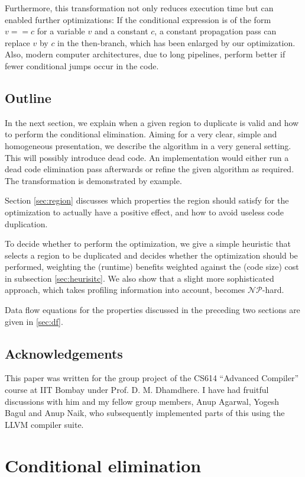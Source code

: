\documentclass[halfparskip]{scrartcl}
\begin{document}
Furthermore, this transformation not only reduces execution time but can enabled further optimizations: If the conditional expression is of the form $v==c$ for a variable $v$ and a constant $c$, a constant propagation pass can replace $v$ by $c$ in the then-branch, which has been enlarged by our optimization. Also, modern computer architectures, due to long pipelines, perform better if fewer conditional jumps occur in the code.

\subsection{Outline}

In the next section, we explain when a given region to duplicate is valid and how to perform the conditional elimination. Aiming for a very clear, simple and homogeneous presentation, we describe the algorithm in a very general setting. This will possibly introduce dead code. An implementation would either run a dead code elimination pass afterwards or refine the given algorithm as required. The transformation is demonstrated by example.

Section \ref{sec:region} discusses which properties the region should satisfy for the optimization to actually have a positive effect, and how to avoid useless code duplication.

To decide whether to perform the optimization, we give a simple heuristic that selects a region to be duplicated and decides whether the optimization should be performed, weighting the (runtime) benefits weighted against the (code size) cost in subsection \ref{sec:heurisitc}. We also show that a slight more sophisticated approach, which takes profiling information into account, becomes $\mathcal{NP}$-hard.

Data flow equations for the properties discussed in the preceding two sections are given in \ref{sec:df}.

\subsection{Acknowledgements}

This paper was written for the group project of the CS614 “Advanced Compiler” course at IIT Bombay under Prof. D. M. Dhamdhere. I have had fruitful discussions with him and my fellow group members, Anup Agarwal, Yogesh Bagul and Anup Naik, who subsequently implemented parts of this using the LLVM compiler suite. 


\section{Conditional elimination}
\end{document}
